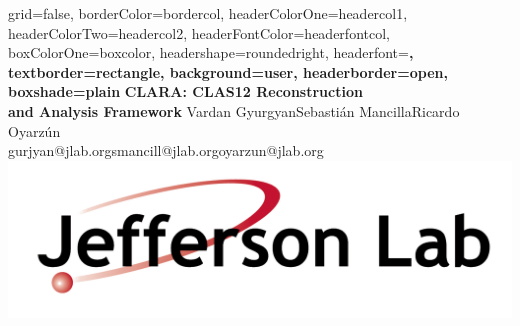 \documentclass[a0paper,portrait]{baposter}
\begin{document}
\background{ %
}

\begin{poster}{
grid=false,
borderColor=bordercol, %
headerColorOne=headercol1, %
headerColorTwo=headercol2, %
headerFontColor=headerfontcol, %
boxColorOne=boxcolor, %
headershape=roundedright, %
headerfont=\Large\sf\bf, %
textborder=rectangle,
background=user,
headerborder=open, %
boxshade=plain
}
{}
%
%
{\sf\bf CLARA: CLAS12 Reconstruction\\and Analysis Framework} %
{\vspace{1em} Vardan Gyurgyan\hspace{2em}Sebasti\'an Mancilla\hspace{2em}Ricardo Oyarz\'un\\ %
{\smaller gurjyan@jlab.org\hspace{4em}smancill@jlab.org\hspace{4em}oyarzun@jlab.org}} %
{\includegraphics[scale=0.65]{logo}} %



\end{poster}
\end{document}

